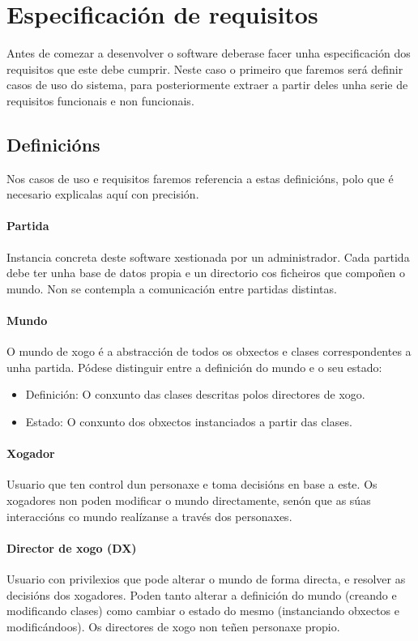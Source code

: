 \chapter{Especificación de requisitos}

Antes de comezar a desenvolver o software deberase facer unha especificación dos requisitos que este debe cumprir. Neste caso o primeiro que faremos será definir casos de uso do sistema, para posteriormente extraer a partir deles unha serie de requisitos funcionais e non funcionais.

\section{Definicións}
Nos casos de uso e requisitos faremos referencia a estas definicións, polo que é necesario explicalas aquí con precisión.

\subsubsection{Partida}
Instancia concreta deste software xestionada por un administrador. Cada partida debe ter unha base de datos propia e un directorio cos ficheiros que compoñen o mundo. Non se contempla a comunicación entre partidas distintas.

\subsubsection{Mundo}
O mundo de xogo é a abstracción de todos os obxectos e clases correspondentes a unha partida. Pódese distinguir entre a definición do mundo e o seu estado:
\begin{itemize}
\item Definición: O conxunto das clases descritas polos directores de xogo.
\item Estado: O conxunto dos obxectos instanciados a partir das clases.
\end{itemize}

\subsubsection{Xogador}
Usuario que ten control dun personaxe e toma decisións en base a este. Os xogadores non poden modificar o mundo directamente, senón que as súas interaccións co mundo realízanse a través dos personaxes.

\subsubsection{Director de xogo (DX)}
Usuario con privilexios que pode alterar o mundo de forma directa, e resolver as decisións dos xogadores. Poden tanto alterar a definición do mundo (creando e modificando clases) como cambiar o estado do mesmo (instanciando obxectos e modificándoos). Os directores de xogo non teñen personaxe propio.

